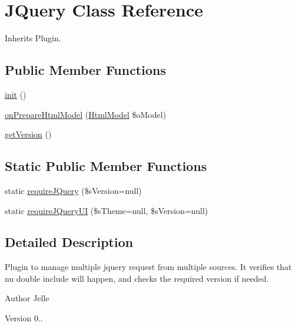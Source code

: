 \hypertarget{class_j_query}{\section{J\-Query Class Reference}
\label{class_j_query}
}


Inherits Plugin.

\subsection*{Public Member Functions}
\begin{DoxyCompactItemize}
\item 
\hyperlink{class_j_query_a8d4f75f692b4e9acf731193dc371e8bb}{init} ()
\item 
\hyperlink{class_j_query_aa33ea2168deb17bd7ba778a245721d32}{on\-Prepare\-Html\-Model} (\hyperlink{class_html_model}{Html\-Model} \$o\-Model)
\item 
\hyperlink{class_j_query_ab8b0399bc7a8a5220b6147249c744282}{get\-Version} ()
\end{DoxyCompactItemize}
\subsection*{Static Public Member Functions}
\begin{DoxyCompactItemize}
\item 
static \hyperlink{class_j_query_ac6fd437acd8af770a4851926b2849263}{require\-J\-Query} (\$s\-Version=null)
\item 
static \hyperlink{class_j_query_a9030767e1eaa4838de89d8cfadd044d6}{require\-J\-Query\-U\-I} (\$s\-Theme=null, \$s\-Version=null)
\end{DoxyCompactItemize}


\subsection{Detailed Description}
Plugin to manage multiple jquery request from multiple sources. It verifies that nu double include will happen, and checks the required version if needed.

\begin{DoxyAuthor}{Author}
Jelle 
\end{DoxyAuthor}
\begin{DoxyVersion}{Version}
0.. 
\end{DoxyVersion}



